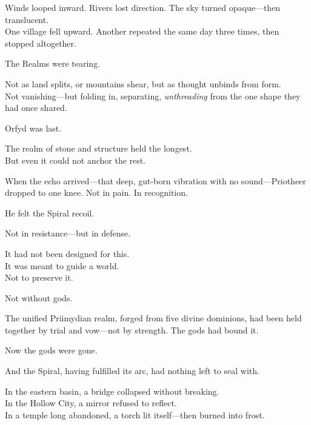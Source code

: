 \documentclass[12pt]{article}
\begin{document}
\vspace{0.5em}
Winds looped inward. Rivers lost direction. The sky turned opaque---then translucent.\\
One village fell upward. Another repeated the same day three times, then stopped altogether.

\vspace{0.5em}
The Realms were tearing.

\vspace{0.5em}
Not as land splits, or mountains shear, but as thought unbinds from form.\\
Not vanishing---but folding in, separating, \textit{unthreading} from the one shape they had once shared.

\vspace{0.5em}
Orfyd was last.

\vspace{0.5em}
The realm of stone and structure held the longest.\\
But even it could not anchor the rest.

\vspace{0.5em}
When the echo arrived---that deep, gut-born vibration with no sound---Priotheer dropped to one knee. Not in pain. In recognition.

\vspace{0.5em}
He felt the Spiral recoil.

\vspace{0.5em}
Not in resistance---but in defense.

\vspace{0.5em}
It had not been designed for this.\\
It was meant to guide a world.\\
Not to preserve it.

\vspace{0.5em}
Not without gods.

\vspace{0.5em}
The unified Priimydian realm, forged from five divine dominions, had been held together by trial and vow---not by strength. The gods had bound it.

\vspace{0.5em}
Now the gods were gone.

\vspace{0.5em}
And the Spiral, having fulfilled its arc, had nothing left to seal with.

\vspace{0.5em}
In the eastern basin, a bridge collapsed without breaking.\\
In the Hollow City, a mirror refused to reflect.\\
In a temple long abandoned, a torch lit itself---then burned into frost.
\end{document}

